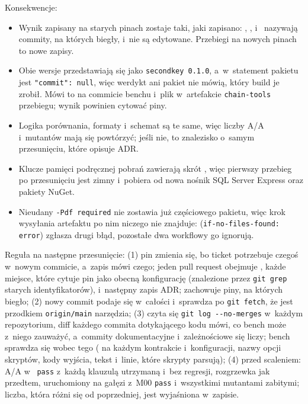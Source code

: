 Konsekwencje:
\begin{itemize}
  \item Wynik zapisany na starych pinach zostaje taki, jaki zapisano: , ,
     i~ nazywają commity, na których biegły, i~nie są edytowane. Przebiegi
    na nowych pinach to nowe zapisy.
  \item Obie wersje przedstawiają się jako \texttt{secondkey 0.1.0}, a~w~statement pakietu
    jest \texttt{"commit": null}, więc werdykt ani pakiet nie mówią, który build je zrobił.
    Mówi to  na commicie benchu i~plik  w~artefakcie
    \texttt{chain-tools} przebiegu; wynik powinien cytować piny.
  \item Logika porównania, formaty i~schemat są te same, więc liczby A/A i~mutantów mają się
    powtórzyć; jeśli nie, to znalezisko o~samym przesunięciu, które opisuje ADR.
  \item Klucze pamięci podręcznej pobrań zawierają skrót , więc pierwszy
    przebieg po przesunięciu jest zimny i~pobiera od nowa nośnik SQL Server Express oraz
    pakiety NuGet.
  \item Nieudany \texttt{-Pdf required} nie zostawia już częściowego pakietu, więc krok
    wysyłania artefaktu po nim niczego nie znajduje: 
    (\texttt{if-no-files-found: error}) zgłasza drugi błąd, pozostałe dwa workflowy go
    ignorują.
\end{itemize}

Reguła na następne przesunięcie: (1) pin zmienia się, bo ticket potrzebuje czegoś w~nowym
commicie, a~zapis mówi czego; jeden pull request obejmuje , każde miejsce,
które cytuje pin jako obecną konfigurację (znalezione przez \texttt{git grep} starych
identyfikatorów), i~następny zapis ADR;  zachowuje piny, na których biegło;
(2) nowy commit podaje się w~całości i~sprawdza po \texttt{git fetch}, że jest przodkiem
\texttt{origin/main} narzędzia; (3) czyta się \texttt{git log -{}-no-merges} w~każdym
repozytorium, diff każdego commita dotykającego kodu mówi, co bench może z~niego zauważyć,
a~commity dokumentacyjne i~zależnościowe się liczy; bench sprawdza się wobec tego
( na każdym kontrakcie i~konfiguracji, nazwy opcji skryptów, kody
wyjścia, tekst i~linie, które skrypty parsują); (4) przed scaleniem: A/A w~
\texttt{pass} z~każdą klauzulą utrzymaną i~bez regresji, rozgrzewka jak przedtem,
 uruchomiony na gałęzi z~M00 \texttt{pass} i~wszystkimi mutantami
zabitymi; liczba, która różni się od poprzedniej, jest wyjaśniona w~zapisie.


